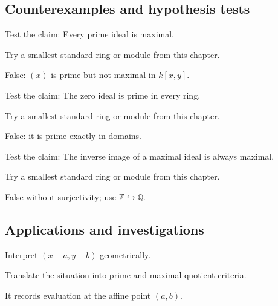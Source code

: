 \subsection*{Counterexamples and hypothesis tests}

\begin{exercise}\label{exr:v02-expand-10}
Test the claim: Every prime ideal is maximal.
\end{exercise}
\begin{hint}
Try a smallest standard ring or module from this chapter.
\end{hint}
\begin{solution}
False: $(x)$ is prime but not maximal in $k[x,y]$.
\end{solution}

\begin{exercise}\label{exr:v02-expand-11}
Test the claim: The zero ideal is prime in every ring.
\end{exercise}
\begin{hint}
Try a smallest standard ring or module from this chapter.
\end{hint}
\begin{solution}
False: it is prime exactly in domains.
\end{solution}

\begin{exercise}\label{exr:v02-expand-12}
Test the claim: The inverse image of a maximal ideal is always maximal.
\end{exercise}
\begin{hint}
Try a smallest standard ring or module from this chapter.
\end{hint}
\begin{solution}
False without surjectivity; use $\mathbb Z\hookrightarrow\mathbb Q$.
\end{solution}

\subsection*{Applications and investigations}

\begin{exercise}\label{exr:v02-expand-13}
Interpret $(x-a,y-b)$ geometrically.
\end{exercise}
\begin{hint}
Translate the situation into prime and maximal quotient criteria.
\end{hint}
\begin{solution}
It records evaluation at the affine point $(a,b)$.
\end{solution}

